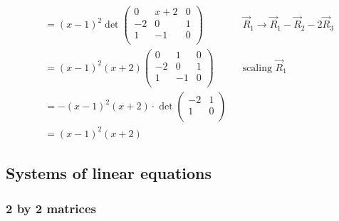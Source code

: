 \documentclass{../../template/note}
\begin{document}
\begin{example}
\begin{align*}
            &= (x-1)^2 \det \begin{pmatrix}
             0 & x+2 & 0 \\
             -2 & 0 & 1 \\
             1 & -1 & 0 \\
            \end{pmatrix} && \vec R_1 \to \vec R_1 - \vec R_2 - 2 \vec R_3 \\
            &= (x-1)^2(x+2) \begin{pmatrix}
             0 & 1 & 0 \\
             -2 & 0 & 1 \\
             1 & -1 & 0 \\
            \end{pmatrix} && \text{scaling } \vec R_1 \\
            &= -(x-1)^2(x+2) \cdot \det \begin{pmatrix}
             -2 & 1 \\
             1 & 0 \\
            \end{pmatrix} \\
            &= (x-1)^2(x+2)
        \end{align*}
    \end{example}
    
    \subsection{Systems of linear equations}

    \subsubsection{2 by 2 matrices}
\end{document}
